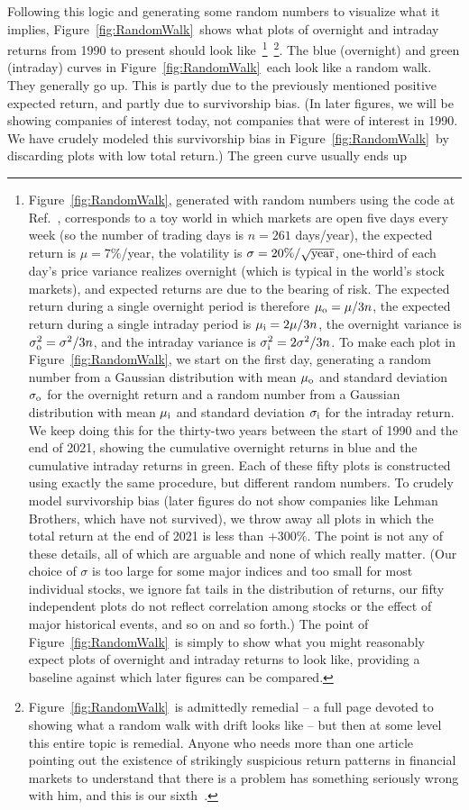 \documentclass[twocolumn,twoside,prd,floatfix,letterpaper]{revtex4}
\def \FigRandomWalk {Figure~\ref{fig:RandomWalk}}
\def \citeKnuteson {\cite{knuteson2016,knuteson2018,knuteson2019,knuteson2020,knuteson2021}}
\begin{document}
Following this logic and generating some random numbers to visualize what it implies, \FigRandomWalk\ shows what plots of overnight and intraday returns from 1990 to present should look like~\footnote{\FigRandomWalk, generated with random numbers using the code at Ref.~\cite{thisArticleWebpage}, corresponds to a toy world in which markets are open five days every week (so the number of trading days is $n=261$ days/year), the expected return is $\mu=7\%$/year, the volatility is $\sigma=20\%/\sqrt{\rm{year}}$, one-third of each day's price variance realizes overnight (which is typical in the world's stock markets), and expected returns are due to the bearing of risk.  The expected return during a single overnight period is therefore $\mu_{\rm{o}}=\mu/3n$, the expected return during a single intraday period is $\mu_{\rm{i}}=2\mu/3n$, the overnight variance is $\sigma_{\rm{o}}^2=\sigma^2/3n$, and the intraday variance is $\sigma_{\rm{i}}^2=2\sigma^2/3n$.  To make each plot in \FigRandomWalk, we start on the first day, generating a random number from a Gaussian distribution with mean $\mu_{\rm{o}}$ and standard deviation $\sigma_{\rm{o}}$ for the overnight return and a random number from a Gaussian distribution with mean $\mu_{\rm{i}}$ and standard deviation $\sigma_{\rm{i}}$ for the intraday return.  We keep doing this for the thirty-two years between the start of 1990 and the end of 2021, showing the cumulative overnight returns in blue and the cumulative intraday returns in green.  Each of these fifty plots is constructed using exactly the same procedure, but different random numbers.  To crudely model survivorship bias (later figures do not show companies like Lehman Brothers, which have not survived), we throw away all plots in which the total return at the end of 2021 is less than $+300\%$.  The point is not any of these details, all of which are arguable and none of which really matter.  (Our choice of $\sigma$ is too large for some major indices and too small for most individual stocks, we ignore fat tails in the distribution of returns, our fifty independent plots do not reflect correlation among stocks or the effect of major historical events, and so on and so forth.)  The point of \FigRandomWalk\ is simply to show what you might reasonably expect plots of overnight and intraday returns to look like, providing a baseline against which later figures can be compared.}~\footnote{\FigRandomWalk\ is admittedly remedial -- a full page devoted to showing what a random walk with drift looks like -- but then at some level this entire topic is remedial.  Anyone who needs more than one article pointing out the existence of strikingly suspicious return patterns in financial markets to understand that there is a problem has something seriously wrong with him, and this is our sixth~\citeKnuteson.}.  The blue (overnight) and green (intraday) curves in \FigRandomWalk\ each look like a random walk.  They generally go up.  This is partly due to the previously mentioned positive expected return, and partly due to survivorship bias.  (In later figures, we will be showing companies of interest today, not companies that were of interest in 1990.  We have crudely modeled this survivorship bias in \FigRandomWalk\ by discarding plots with low total return.)  The green curve usually ends up 
\end{document}
